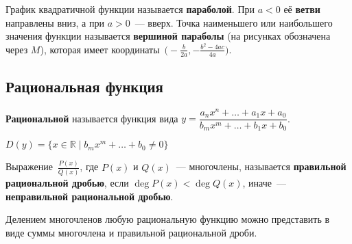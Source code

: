  График квадратичной функции называется \textbf{параболой}.
При $a < 0$ её \textbf{ветви} направлены вниз, а при $a > 0$~--- вверх.
Точка наименьшего или наибольшего значения функции называется \textbf{вершиной параболы} (на рисунках обозначена через $M$), которая имеет координаты~$\bigl( -\frac{b}{2a}, -\frac{b^2 - 4ac}{4a} \bigr)$.
\begin{center}
\end{center}

\subsection{Рациональная функция}
 \textbf{Рациональной} называется функция вида $y = \dfrac{a_n x^n + \ldots + a_1 x + a_0}{b_m x^m + \ldots + b_1 x + b_0}$.

$D(y) = \{ x \in \mathbb R \mid b_m x^m + \ldots + b_0 \neq 0 \}$

Выражение~$\frac{P(x)}{Q(x)}$, где $P(x)$ и $Q(x)$~--- многочлены, называется \textbf{правильной рациональной дробью}, если $\deg P(x) < \deg Q(x)$, иначе~--- \textbf{неправильной рациональной дробью}.

Делением многочленов любую рациональную функцию можно представить в виде суммы многочлена и правильной рациональной дроби.